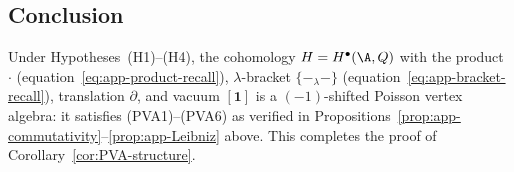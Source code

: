\subsection{Conclusion}

\begin{corollary}
Under Hypotheses~\textrm{(H1)--(H4)}, the cohomology $H = H^\bullet(\A,Q)$ with the product $\cdot$ (equation~\eqref{eq:app-product-recall}), $\lambda$-bracket $\{-{}_\lambda -\}$ (equation~\eqref{eq:app-bracket-recall}), translation $\partial$, and vacuum $[\mathbf{1}]$ is a $(-1)$-shifted Poisson vertex algebra: it satisfies \textrm{(PVA1)--(PVA6)} as verified in Propositions~\ref{prop:app-commutativity}--\ref{prop:app-Leibniz} above. This completes the proof of Corollary~\ref{cor:PVA-structure}.
\end{corollary}
